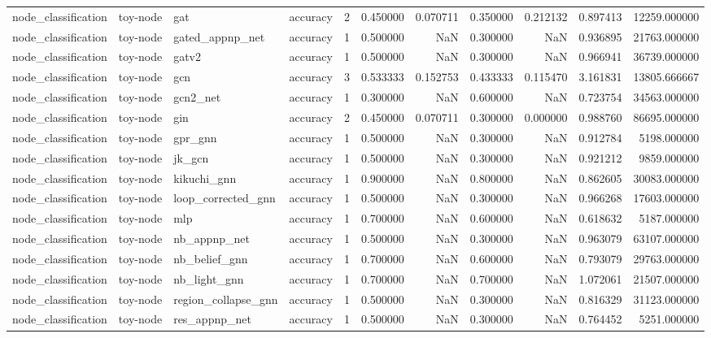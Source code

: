 \begin{tabular}{llllrrrrrrr}
node_classification & toy-node & gat & accuracy & 2 & 0.450000 & 0.070711 & 0.350000 & 0.212132 & 0.897413 & 12259.000000 \\
node_classification & toy-node & gated_appnp_net & accuracy & 1 & 0.500000 & NaN & 0.300000 & NaN & 0.936895 & 21763.000000 \\
node_classification & toy-node & gatv2 & accuracy & 1 & 0.500000 & NaN & 0.300000 & NaN & 0.966941 & 36739.000000 \\
node_classification & toy-node & gcn & accuracy & 3 & 0.533333 & 0.152753 & 0.433333 & 0.115470 & 3.161831 & 13805.666667 \\
node_classification & toy-node & gcn2_net & accuracy & 1 & 0.300000 & NaN & 0.600000 & NaN & 0.723754 & 34563.000000 \\
node_classification & toy-node & gin & accuracy & 2 & 0.450000 & 0.070711 & 0.300000 & 0.000000 & 0.988760 & 86695.000000 \\
node_classification & toy-node & gpr_gnn & accuracy & 1 & 0.500000 & NaN & 0.300000 & NaN & 0.912784 & 5198.000000 \\
node_classification & toy-node & jk_gcn & accuracy & 1 & 0.500000 & NaN & 0.300000 & NaN & 0.921212 & 9859.000000 \\
node_classification & toy-node & kikuchi_gnn & accuracy & 1 & 0.900000 & NaN & 0.800000 & NaN & 0.862605 & 30083.000000 \\
node_classification & toy-node & loop_corrected_gnn & accuracy & 1 & 0.500000 & NaN & 0.300000 & NaN & 0.966268 & 17603.000000 \\
node_classification & toy-node & mlp & accuracy & 1 & 0.700000 & NaN & 0.600000 & NaN & 0.618632 & 5187.000000 \\
node_classification & toy-node & nb_appnp_net & accuracy & 1 & 0.500000 & NaN & 0.300000 & NaN & 0.963079 & 63107.000000 \\
node_classification & toy-node & nb_belief_gnn & accuracy & 1 & 0.700000 & NaN & 0.600000 & NaN & 0.793079 & 29763.000000 \\
node_classification & toy-node & nb_light_gnn & accuracy & 1 & 0.700000 & NaN & 0.700000 & NaN & 1.072061 & 21507.000000 \\
node_classification & toy-node & region_collapse_gnn & accuracy & 1 & 0.500000 & NaN & 0.300000 & NaN & 0.816329 & 31123.000000 \\
node_classification & toy-node & res_appnp_net & accuracy & 1 & 0.500000 & NaN & 0.300000 & NaN & 0.764452 & 5251.000000 \\

\end{tabular}
